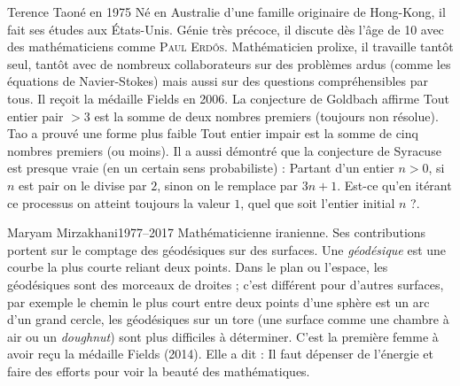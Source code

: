 \documentclass[10pt,class=article,crop=false]{standalone}
\begin{document}
\begin{multicols}{2}
\begin{biographie}{Terence Tao}{né en 1975}
Né en Australie d'une famille originaire de Hong-Kong, il fait ses études aux États-Unis.
Génie très précoce, il discute dès l'âge de 10 avec des mathématiciens comme \textsc{Paul Erdős}.
Mathématicien prolixe, il travaille tantôt seul, tantôt avec de nombreux collaborateurs sur des problèmes ardus (comme les équations de Navier-Stokes) mais aussi sur des questions compréhensibles par tous. Il reçoit la médaille Fields en 2006.
La conjecture de Goldbach affirme \og{}Tout entier pair $>3$ est la somme de deux nombres premiers\fg{}
(toujours non résolue). Tao a  prouvé une forme plus faible \og{}Tout entier impair est la somme de cinq nombres premiers (ou moins)\fg{}.
Il a aussi démontré que la conjecture de Syracuse est \og{}presque vraie\fg{} (en un certain sens probabiliste) :
\og{}Partant d'un entier $n>0$, si $n$ est pair on le divise par $2$, sinon on le remplace par $3n+1$. 
Est-ce qu'en itérant ce processus on atteint toujours la valeur $1$, quel que soit l'entier initial $n$ ?\fg{}.
\end{biographie}


\begin{biographie}{Maryam Mirzakhani}{1977--2017}
Mathématicienne iranienne.
Ses contributions portent sur le comptage des géodésiques sur des surfaces.
Une \emph{géodésique} est une courbe la plus courte reliant deux points. Dans le plan ou l'espace, les géodésiques sont des morceaux de droites ; c'est différent pour d'autres surfaces, par exemple le chemin le plus court entre deux points d'une sphère est un arc d'un \og{}grand cercle\fg{}, les géodésiques sur un tore (une surface comme une chambre à air ou un \emph{doughnut}) sont plus difficiles à déterminer.
C'est la première femme à avoir reçu la médaille Fields (2014). 
Elle a dit : \og{}Il faut dépenser de l'énergie et faire des efforts pour voir la beauté des mathématiques.\fg{}
\end{biographie}


\end{multicols}
\end{document}
